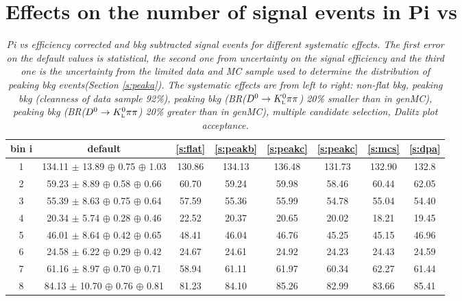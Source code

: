 \section{Effects on the number of signal events in \4Pi vs \KlPiPi}
\begin{table}[h!]
\begin{center}
\begin{tabular}{c |c |c |c |c | c | c| c}
bin i & default & \ref{s:flat} & \ref{s:peakb} & \ref{s:peakc} & \ref{s:peakc} & \ref{s:mcs} & \ref{s:dpa} \\
\hline
1 & 134.11 $\pm$ 13.89 $\oplus$ 0.75 $\oplus$ 1.03 & 130.86 & 134.13 & 136.48 & 131.73 & 132.90 & 132.8 \\ 
\hline
2 & 59.23 $\pm$ 8.89 $\oplus$ 0.58 $\oplus$ 0.66 & 60.70 & 59.24 & 59.98 & 58.46 & 60.44 & 62.05 \\ 
\hline
3 & 55.39 $\pm$ 8.63 $\oplus$ 0.75 $\oplus$ 0.64 & 57.59 & 55.36 & 55.99 & 54.78 & 55.04 & 54.40 \\ 
\hline
4 & 20.34 $\pm$ 5.74 $\oplus$ 0.28 $\oplus$ 0.46 & 22.52 & 20.37 & 20.65 & 20.02 & 18.21 & 19.45 \\ 
\hline
5 & 46.01 $\pm$ 8.64 $\oplus$ 0.42 $\oplus$ 0.65 & 48.41 & 46.04 & 46.76 & 45.25 & 45.15 & 46.96 \\ 
\hline
6 & 24.58 $\pm$ 6.22 $\oplus$ 0.29 $\oplus$ 0.42 & 24.67 & 24.61 & 24.92 & 24.23 & 24.43 & 24.59 \\ 
\hline
7 & 61.16 $\pm$ 8.97 $\oplus$ 0.70 $\oplus$ 0.71 & 58.94 & 61.11 & 61.97 & 60.34 & 62.27 & 61.44 \\ 
\hline
8 & 84.13 $\pm$ 10.70 $\oplus$ 0.76 $\oplus$ 0.81 & 81.23 & 84.10 & 85.26 & 82.99 & 83.66 & 85.41 \\ 
\end{tabular}
\end{center}
\caption{\textit{\4Pi vs \KsPiPi efficiency corrected and bkg subtracted signal events for different systematic effects. The first error on the default values is statistical, the second one from uncertainty on the signal efficiency and the third one is the uncertainty from the limited data and MC sample used to determine the distribution of peaking bkg events(Section \ref{s:peaka}). The systematic effects are from left to right: non-flat bkg, peaking bkg (cleanness of data sample 92\%), peaking bkg (BR($D^0 \rightarrow {\ensuremath{K^0_{\rm\scriptscriptstyle L}}}{\ensuremath{\pi}}\pi$) 20\% smaller than in genMC), peaking bkg (BR($D^0 \rightarrow {\ensuremath{K^0_{\rm\scriptscriptstyle L}}}{\ensuremath{\pi}}\pi$) 20\% greater than in genMC), multiple candidate selection, Dalitz plot acceptance. }}
\end{table}